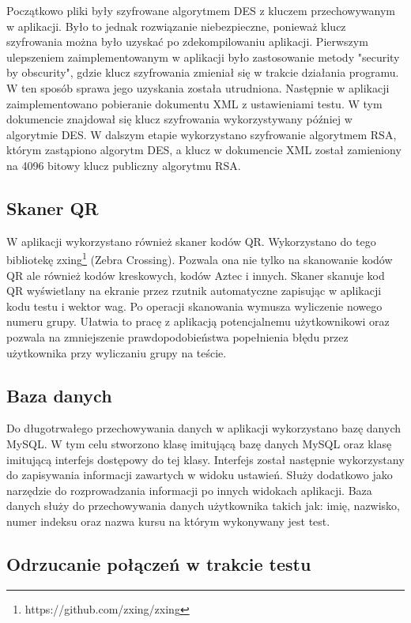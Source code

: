 \documentclass{report}
\begin{document}
			Początkowo pliki były szyfrowane algorytmem DES z kluczem przechowywanym w aplikacji. Było to jednak rozwiązanie niebezpieczne, ponieważ klucz szyfrowania można było uzyskać po zdekompilowaniu aplikacji. Pierwszym ulepszeniem zaimplementowanym w aplikacji było zastosowanie metody "security by obscurity", gdzie klucz szyfrowania zmieniał się w trakcie działania programu. W ten sposób sprawa jego uzyskania została utrudniona. Następnie w aplikacji zaimplementowano pobieranie dokumentu XML z ustawieniami testu. W tym dokumencie znajdował się klucz szyfrowania wykorzystywany później w algorytmie DES. W dalszym etapie wykorzystano szyfrowanie algorytmem RSA, którym zastąpiono algorytm DES, a klucz w dokumencie XML został zamieniony na 4096 bitowy klucz publiczny algorytmu RSA.
		
			\subsection{Skaner QR}
			
			W aplikacji wykorzystano również skaner kodów QR. Wykorzystano do tego bibliotekę zxing\footnote{https://github.com/zxing/zxing} (Zebra Crossing). Pozwala ona nie tylko na skanowanie kodów QR ale również kodów kreskowych, kodów Aztec i innych. Skaner skanuje kod QR wyświetlany na ekranie przez rzutnik automatyczne zapisując w aplikacji kodu testu i wektor wag. Po operacji skanowania wymusza wyliczenie nowego numeru grupy. Ułatwia to pracę z aplikacją potencjalnemu użytkownikowi oraz pozwala na zmniejszenie prawdopodobieństwa popełnienia błędu przez użytkownika przy wyliczaniu grupy na teście.
			
			\subsection{Baza danych}
			
			Do długotrwałego przechowywania danych w aplikacji wykorzystano bazę danych MySQL. W tym celu stworzono klasę imitującą bazę danych MySQL oraz klasę imitującą interfejs dostępowy do tej klasy. Interfejs został następnie wykorzystany do zapisywania informacji zawartych w widoku ustawień. Służy dodatkowo jako narzędzie do rozprowadzania informacji po innych widokach aplikacji. Baza danych służy do przechowywania danych użytkownika takich jak: imię, nazwisko, numer indeksu oraz nazwa kursu na którym wykonywany jest test. 
			
			\subsection{Odrzucanie połączeń w trakcie testu}
			
\end{document}
